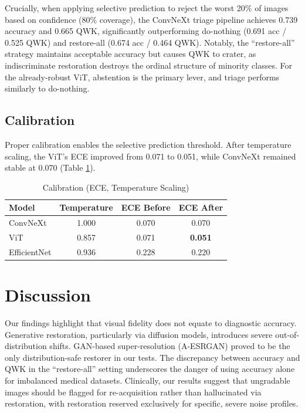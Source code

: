 \documentclass[conference]{IEEEtran}
\begin{document}
Crucially, when applying selective prediction to reject the worst 20\% of images based on confidence (80\% coverage), the ConvNeXt triage pipeline achieves 0.739 accuracy and 0.665 QWK, significantly outperforming do-nothing (0.691 acc / 0.525 QWK) and restore-all (0.674 acc / 0.464 QWK). Notably, the ``restore-all'' strategy maintains acceptable accuracy but causes QWK to crater, as indiscriminate restoration destroys the ordinal structure of minority classes. For the already-robust ViT, abstention is the primary lever, and triage performs similarly to do-nothing.

\subsection{Calibration}
Proper calibration enables the selective prediction threshold. After temperature scaling, the ViT's ECE improved from 0.071 to 0.051, while ConvNeXt remained stable at 0.070 (Table \ref{tab:calibration}).




\begin{table}[htbp]
\caption{Calibration (ECE, Temperature Scaling)}
\begin{center}
\begin{tabular}{lccc}
\toprule
\textbf{Model} & \textbf{Temperature} & \textbf{ECE Before} & \textbf{ECE After} \\
\midrule
ConvNeXt & 1.000 & 0.070 & 0.070 \\
ViT & 0.857 & 0.071 & \textbf{0.051} \\
EfficientNet & 0.936 & 0.228 & 0.220 \\
\bottomrule
\end{tabular}
\label{tab:calibration}
\end{center}
\end{table}

\section{Discussion}
Our findings highlight that visual fidelity does not equate to diagnostic accuracy. Generative restoration, particularly via diffusion models, introduces severe out-of-distribution shifts. GAN-based super-resolution (A-ESRGAN) proved to be the only distribution-safe restorer in our tests. The discrepancy between accuracy and QWK in the ``restore-all'' setting underscores the danger of using accuracy alone for imbalanced medical datasets. Clinically, our results suggest that ungradable images should be flagged for re-acquisition rather than hallucinated via restoration, with restoration reserved exclusively for specific, severe noise profiles.
\end{document}
